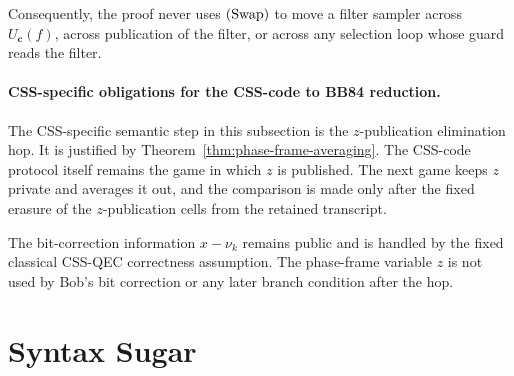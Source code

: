 \documentclass[acmsmall,screen,review,anonymous,nonacm]{acmart}
\theoremstyle{defn_style}
\begin{document}
Consequently, the proof never uses \({\rm (Swap)}\) to move a filter sampler
across \(U_{\textbf{c}}(f)\), across publication of the filter, or across any
selection loop whose guard reads the filter.

\paragraph{CSS-specific obligations for the CSS-code to BB84 reduction.}

The CSS-specific semantic step in this subsection is the \(z\)-publication
elimination hop.  It is justified by
Theorem~\ref{thm:phase-frame-averaging}.  The CSS-code protocol itself remains
the game in which \(z\) is published.  The next game keeps \(z\) private and
averages it out, and the comparison is made only after the fixed erasure of the
\(z\)-publication cells from the retained transcript.

The bit-correction information \(x-\nu_k\) remains public and is handled by the
fixed classical CSS-QEC correctness assumption.  The phase-frame variable \(z\)
is not used by Bob's bit correction or any later branch condition after the hop.


\appendix

\section{Syntax Sugar}
\label{app:syntax-sugar}
\end{document}
